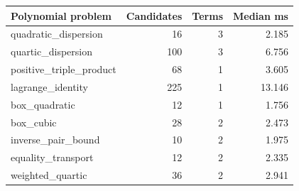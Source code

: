 \begin{tabular}{lrrr}
\toprule
Polynomial problem & Candidates & Terms & Median ms \\
\midrule
quadratic\_dispersion & 16 & 3 & 2.185 \\
quartic\_dispersion & 100 & 3 & 6.756 \\
positive\_triple\_product & 68 & 1 & 3.605 \\
lagrange\_identity & 225 & 1 & 13.146 \\
box\_quadratic & 12 & 1 & 1.756 \\
box\_cubic & 28 & 2 & 2.473 \\
inverse\_pair\_bound & 10 & 2 & 1.975 \\
equality\_transport & 12 & 2 & 2.335 \\
weighted\_quartic & 36 & 2 & 2.941 \\
\bottomrule
\end{tabular}
